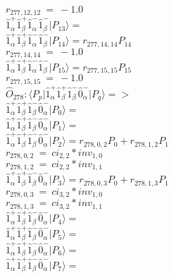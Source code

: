 \documentclass[14pt]{article}
\begin{document}
    ${r}_{277,12,12}\ =\ -1.0 $ \\ 
    $ \hat{1}_{\alpha}^{+}\hat{1}_{\beta}^{+}\hat{1}_{\alpha}^{-}\hat{1}_{\beta}^{-} \vert{P_{13}}\rangle =  $ \\ 
    $ \hat{1}_{\alpha}^{+}\hat{1}_{\beta}^{+}\hat{1}_{\alpha}^{-}\hat{1}_{\beta}^{-} \vert{P_{14}}\rangle = {r}_{277,14,14}P_{14} $ \\ 
    ${r}_{277,14,14}\ =\ -1.0 $ \\ 
    $ \hat{1}_{\alpha}^{+}\hat{1}_{\beta}^{+}\hat{1}_{\alpha}^{-}\hat{1}_{\beta}^{-} \vert{P_{15}}\rangle = {r}_{277,15,15}P_{15} $ \\ 
    ${r}_{277,15,15}\ =\ -1.0 $ \\ 
    
    $\hat{O}_{278}:  \langle{P_p}\vert \hat{1}_{\alpha}^{+}\hat{1}_{\beta}^{+}\hat{1}_{\beta}^{-}\hat{0}_{\alpha}^{-} \vert{P_q}\rangle => $ \\ 
    $ \hat{1}_{\alpha}^{+}\hat{1}_{\beta}^{+}\hat{1}_{\beta}^{-}\hat{0}_{\alpha}^{-} \vert{P_{0}}\rangle =  $ \\ 
    $ \hat{1}_{\alpha}^{+}\hat{1}_{\beta}^{+}\hat{1}_{\beta}^{-}\hat{0}_{\alpha}^{-} \vert{P_{1}}\rangle =  $ \\ 
    $ \hat{1}_{\alpha}^{+}\hat{1}_{\beta}^{+}\hat{1}_{\beta}^{-}\hat{0}_{\alpha}^{-} \vert{P_{2}}\rangle = {r}_{278,0,2}P_{0}+{r}_{278,1,2}P_{1} $ \\ 
    ${r}_{278,0,2}\ =\ {ci}_{2,2}*{inv}_{1,0} $ \\ 
    ${r}_{278,1,2}\ =\ {ci}_{2,2}*{inv}_{1,1} $ \\ 
    $ \hat{1}_{\alpha}^{+}\hat{1}_{\beta}^{+}\hat{1}_{\beta}^{-}\hat{0}_{\alpha}^{-} \vert{P_{3}}\rangle = {r}_{278,0,3}P_{0}+{r}_{278,1,3}P_{1} $ \\ 
    ${r}_{278,0,3}\ =\ {ci}_{3,2}*{inv}_{1,0} $ \\ 
    ${r}_{278,1,3}\ =\ {ci}_{3,2}*{inv}_{1,1} $ \\ 
    $ \hat{1}_{\alpha}^{+}\hat{1}_{\beta}^{+}\hat{1}_{\beta}^{-}\hat{0}_{\alpha}^{-} \vert{P_{4}}\rangle =  $ \\ 
    $ \hat{1}_{\alpha}^{+}\hat{1}_{\beta}^{+}\hat{1}_{\beta}^{-}\hat{0}_{\alpha}^{-} \vert{P_{5}}\rangle =  $ \\ 
    $ \hat{1}_{\alpha}^{+}\hat{1}_{\beta}^{+}\hat{1}_{\beta}^{-}\hat{0}_{\alpha}^{-} \vert{P_{6}}\rangle =  $ \\ 
    $ \hat{1}_{\alpha}^{+}\hat{1}_{\beta}^{+}\hat{1}_{\beta}^{-}\hat{0}_{\alpha}^{-} \vert{P_{7}}\rangle =  $ \\ 
\end{document}
